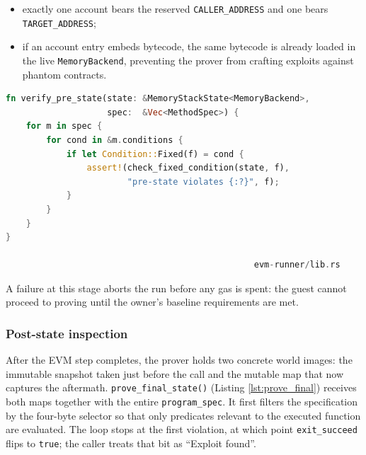 \begin{itemize}
  \item exactly one account bears the reserved \texttt{CALLER\_ADDRESS} and one
        bears \texttt{TARGET\_ADDRESS};
  \item if an account entry embeds bytecode, the same bytecode is already
        loaded in the live \texttt{MemoryBackend}, preventing the prover from
        crafting exploits against phantom contracts.
\end{itemize}

\begin{lstlisting}[caption={[Early rejection of malformed contexts]},language=Rust]
fn verify_pre_state(state: &MemoryStackState<MemoryBackend>,
                    spec:  &Vec<MethodSpec>) {
    for m in spec {
        for cond in &m.conditions {
            if let Condition::Fixed(f) = cond {
                assert!(check_fixed_condition(state, f),
                        "pre-state violates {:?}", f);
            }
        }
    }
}

                                                 evm-runner/lib.rs
\end{lstlisting}

A failure at this stage aborts the run before any gas is spent: the guest
cannot proceed to proving until the owner’s baseline requirements are met.

\subsubsection{Post-state inspection}\label{poststateinspect}

After the EVM step completes, the prover holds two concrete world images: the immutable snapshot taken just before the call and the mutable map that now captures the aftermath. \texttt{prove\_final\_state()} (Listing \ref{lst:prove_final}) receives both maps together with the entire \texttt{program\_spec}. It first filters the specification by the four-byte selector so that only predicates relevant to the executed function are evaluated.
The loop stops at the first violation, at which point \texttt{exit\_succeed} flips to \texttt{true}; the caller treats that bit as
“Exploit found”.


